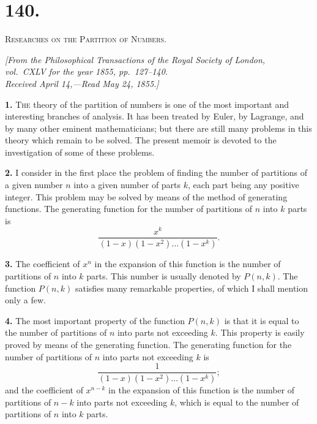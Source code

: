 \documentclass[11pt,a4paper]{book}
\begin{document}
\newpage
\setcounter{page}{234}


\section*{140.}

\textsc{Researches on the Partition of Numbers.}

\begin{flushright}
\textit{[From the Philosophical Transactions of the Royal Society of London,}\\
\textit{vol.\ CXLV for the year 1855, pp.\ 127--140.}\\
\textit{Received April 14,---Read May 24, 1855.]}
\end{flushright}

\textbf{1.} \textsc{The} theory of the partition of numbers is one of the most important and interesting branches of analysis. It has been treated by Euler, by Lagrange, and by many other eminent mathematicians; but there are still many problems in this theory which remain to be solved. The present memoir is devoted to the investigation of some of these problems.

\textbf{2.} I consider in the first place the problem of finding the number of partitions of a given number $n$ into a given number of parts $k$, each part being any positive integer. This problem may be solved by means of the method of generating functions. The generating function for the number of partitions of $n$ into $k$ parts is
\[
\frac{x^k}{(1-x)(1-x^2)\ldots(1-x^k)}.
\]

\newpage
\setcounter{page}{235}

\textbf{3.} The coefficient of $x^n$ in the expansion of this function is the number of partitions of $n$ into $k$ parts. This number is usually denoted by $P(n, k)$. The function $P(n, k)$ satisfies many remarkable properties, of which I shall mention only a few.

\textbf{4.} The most important property of the function $P(n, k)$ is that it is equal to the number of partitions of $n$ into parts not exceeding $k$. This property is easily proved by means of the generating function. The generating function for the number of partitions of $n$ into parts not exceeding $k$ is
\[
\frac{1}{(1-x)(1-x^2)\ldots(1-x^k)};
\]
and the coefficient of $x^{n-k}$ in the expansion of this function is the number of partitions of $n-k$ into parts not exceeding $k$, which is equal to the number of partitions of $n$ into $k$ parts.
\end{document}
